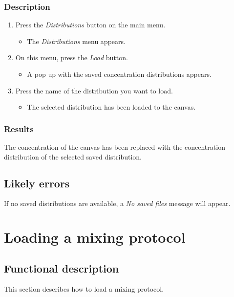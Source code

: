 \subsubsection{Description}
\begin{enumerate}
	\item Press the \emph{Distributions} button on the main menu.
		\begin{itemize}
            \item The \emph{Distributions} menu appears.
		\end{itemize}
	\item On this menu, press the \emph{Load} button.
		\begin{itemize}
            \item  A pop up with the saved concentration distributions appears. 
		\end{itemize}
    \item Press the name of the distribution you want to load.
		\begin{itemize}
           \item The selected distribution has been loaded to the canvas.
		\end{itemize}
\end{enumerate}

\subsubsection{Results}
The concentration of the canvas has been replaced with the concentration distribution of the selected saved distribution.

\subsection{Likely errors}
If no saved distributions are available, a \emph{No saved files} message will appear.


\section{Loading a mixing protocol}
\label{sec:loadMixProt}

\subsection{Functional description}
This section describes how to load a mixing protocol.


